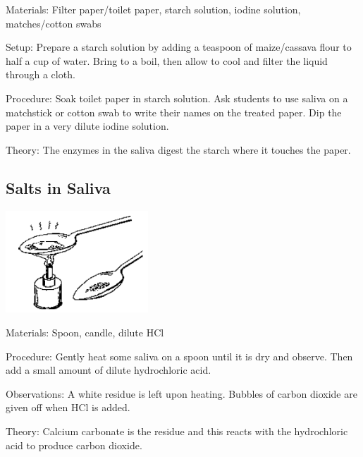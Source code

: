 \begin{multicols}{2}
\begin{description*}
\item[Materials:]{Filter paper/toilet paper, starch solution, iodine solution, matches/cotton swabs}
\item[Setup:]{Prepare a starch solution by adding a teaspoon of maize/cassava flour to half a
cup of water. Bring to a boil, then allow to cool and filter the liquid through a cloth.}
\item[Procedure:]{Soak toilet paper in starch solution. Ask students to use saliva on a matchstick or cotton swab to write their names on the treated paper. Dip the paper in a very dilute iodine solution.}
\item[Theory:]{The enzymes in the saliva digest the starch where it touches the paper.}
\end{description*}

\subsection{Salts in Saliva} %

\begin{center}
\includegraphics[width=0.4\textwidth]{./img/source/saliva-salts.png}
\end{center}

\begin{description*}
\item[Materials:]{Spoon, candle, dilute HCl}
\item[Procedure:]{Gently heat some saliva on a spoon until it is dry and observe. Then add a small amount of dilute hydrochloric acid.}
\item[Observations:]{A white residue is left upon heating. Bubbles of carbon dioxide are given off when HCl is added.}
\item[Theory:]{Calcium carbonate is the residue and this reacts with the hydrochloric acid to produce
carbon dioxide.}
\end{description*}


\end{multicols}
